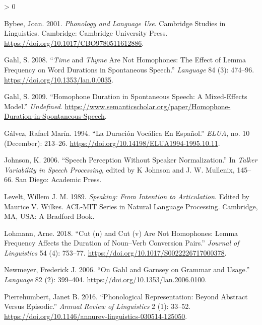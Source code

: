 \documentclass[
  12pt,
]{article}
\newlength{\cslhangindent}
\newenvironment{CSLReferences}[2] %
 {%
  \setlength{\parindent}{0pt}
  \ifodd #1 \everypar{\setlength{\hangindent}{\cslhangindent}}\ignorespaces\fi
  \ifnum #2 > 0
  \setlength{\parskip}{#2\baselineskip}
  \fi
 }%
 {}
\begin{document}
\hypertarget{refs}{}
\begin{CSLReferences}{1}{0}
\leavevmode\hypertarget{ref-bybee_2001}{}%
Bybee, Joan. 2001. \emph{Phonology and {Language} {Use}}. Cambridge
{Studies} in {Linguistics}. Cambridge: Cambridge University Press.
\url{https://doi.org/10.1017/CBO9780511612886}.

\leavevmode\hypertarget{ref-gahl_2008}{}%
Gahl, S. 2008. {``\emph{Time} and \emph{Thyme} {Are} Not {Homophones}:
{The} {Effect} of {Lemma} {Frequency} on {Word} {Durations} in
{Spontaneous} {Speech}.''} \emph{Language} 84 (3): 474--96.
\url{https://doi.org/10.1353/lan.0.0035}.

\leavevmode\hypertarget{ref-gahl_2009}{}%
Gahl, S. 2009. {``Homophone {Duration} in {Spontaneous} {Speech}: {A}
{Mixed}-Effects {Model}.''} \emph{Undefined}.
\url{https://www.semanticscholar.org/paper/Homophone-Duration-in-Spontaneous-Speech}.

\leavevmode\hypertarget{ref-galvez_1994}{}%
Gálvez, Rafael Marín. 1994. {``La Duración Vocálica En Español.''}
\emph{ELUA}, no. 10 (December): 213--26.
\url{https://doi.org/10.14198/ELUA1994-1995.10.11}.

\leavevmode\hypertarget{ref-johnson_2006}{}%
Johnson, K. 2006. {``Speech Perception Without Speaker Normalization.''}
In \emph{Talker Variability in Speech Processing}, edited by K Johnson
and J. W. Mullenix, 145--66. San Diego: Academic Press.

\leavevmode\hypertarget{ref-levelt_1989}{}%
Levelt, Willem J. M. 1989. \emph{Speaking: {From} {Intention} to
{Articulation}}. Edited by Maurice V. Wilkes. {ACL}-{MIT} {Series} in
{Natural} {Language} {Processing}. Cambridge, MA, USA: A Bradford Book.

\leavevmode\hypertarget{ref-lohmann_2018}{}%
Lohmann, Arne. 2018. {``Cut (n) and Cut (v) Are Not Homophones: {Lemma}
Frequency Affects the Duration of Noun--Verb Conversion Pairs.''}
\emph{Journal of Linguistics} 54 (4): 753--77.
\url{https://doi.org/10.1017/S0022226717000378}.

\leavevmode\hypertarget{ref-newmeyer_2006}{}%
Newmeyer, Frederick J. 2006. {``On {Gahl} and {Garnsey} on {Grammar} and
{Usage}.''} \emph{Language} 82 (2): 399--404.
\url{https://doi.org/10.1353/lan.2006.0100}.

\leavevmode\hypertarget{ref-pierrehumbert_2016}{}%
Pierrehumbert, Janet B. 2016. {``Phonological {Representation}: {Beyond}
{Abstract} {Versus} {Episodic}.''} \emph{Annual Review of Linguistics} 2
(1): 33--52.
\url{https://doi.org/10.1146/annurev-linguistics-030514-125050}.

\end{CSLReferences}

\endgroup
\end{document}
